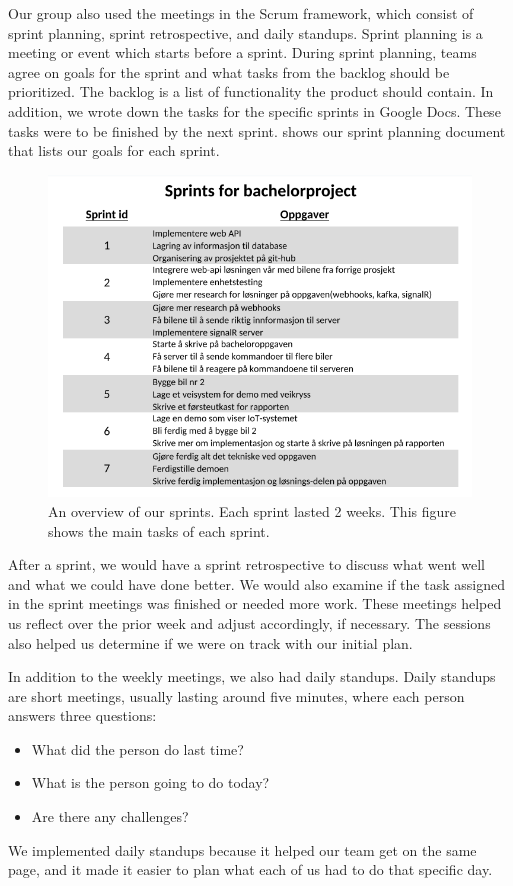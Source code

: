 Our group also used the meetings in the Scrum framework, which consist of sprint planning, sprint retrospective, and daily standups. Sprint planning is a meeting or event which starts before a sprint. During sprint planning, teams agree on goals for the sprint and what tasks from the backlog should be prioritized. The backlog is a list of functionality the product should contain. In addition, we wrote down the tasks for the specific sprints in Google Docs. These tasks were to be finished by the next sprint.  shows our sprint planning document that lists our goals for each sprint.

\begin{figure}[h!]
	\centering
	\includegraphics[width=1\linewidth]{figures/Sprint_overview}
	\caption[Sprint overview]{An overview of our sprints. Each sprint lasted 2 weeks. This figure shows the main tasks of each sprint.}
	\label{fig:sprintoverview}
\end{figure}

After a sprint, we would have a sprint retrospective to discuss what went well and what we could have done better. We would also examine if the task assigned in the sprint meetings was finished or needed more work. These meetings helped us reflect over the prior week and adjust accordingly, if necessary. The sessions also helped us determine if we were on track with our initial plan. 
 
In addition to the weekly meetings, we also had daily standups. Daily standups are short meetings, usually lasting around five minutes, where each person answers three questions:
\begin{itemize}
	\item What did the person do last time? 
	\item What is the person going to do today? 
	\item Are there any challenges?
\end{itemize}
We implemented daily standups because it helped our team get on the same page, and it made it easier to plan what each of us had to do that specific day.

